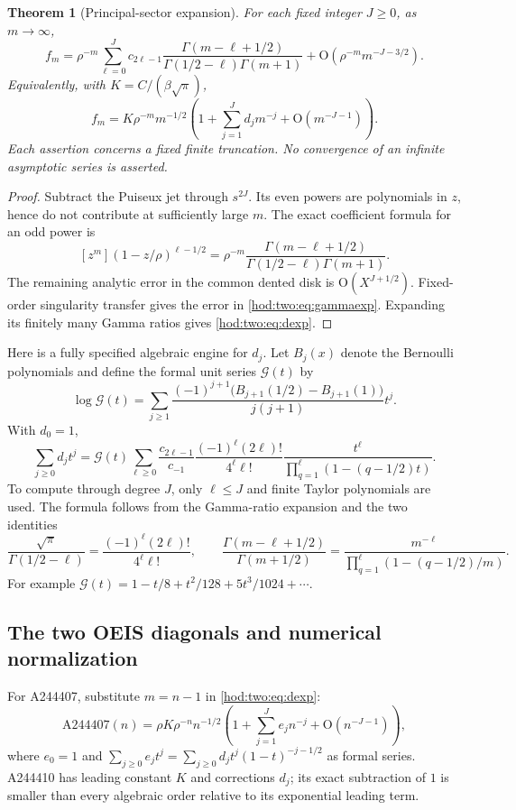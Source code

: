 \documentclass[11pt,letterpaper]{article}
\newtheorem{theorem}{Theorem}[section]
\theoremstyle{definition}\newtheorem{definition}[theorem]{Definition}
\theoremstyle{remark}\newtheorem{remark}[theorem]{Remark}
\newcommand{\bigO}{\mathrm O}
\begin{document}
\begin{theorem}[Principal-sector expansion]\label{hod:two:thm:allorders}
For each fixed integer $J\ge0$, as $m\to\infty$,
\begin{equation}\label{hod:two:eq:gammaexp}
f_m=\rho^{-m}\sum_{\ell=0}^{J}c_{2\ell-1}
\frac{\Gamma(m-\ell+1/2)}{\Gamma(1/2-\ell)\Gamma(m+1)}
+\bigO(\rho^{-m}m^{-J-3/2}).
\end{equation}
Equivalently, with $K=C/(\beta\sqrt\pi)$,
\begin{equation}\label{hod:two:eq:dexp}
f_m=K\rho^{-m}m^{-1/2}
\left(1+\sum_{j=1}^Jd_jm^{-j}+\bigO(m^{-J-1})\right).
\end{equation}
Each assertion concerns a fixed finite truncation. No convergence of an infinite asymptotic series is asserted.
\end{theorem}
\begin{proof}
Subtract the Puiseux jet through $s^{2J}$. Its even powers are polynomials in $z$, hence do not contribute at sufficiently large $m$. The exact coefficient formula for an odd power is
\[
[z^m](1-z/\rho)^{\ell-1/2}
=\rho^{-m}\frac{\Gamma(m-\ell+1/2)}{\Gamma(1/2-\ell)\Gamma(m+1)}.
\]
The remaining analytic error in the common dented disk is $\bigO(X^{J+1/2})$. Fixed-order singularity transfer gives the error in \eqref{hod:two:eq:gammaexp}. Expanding its finitely many Gamma ratios gives \eqref{hod:two:eq:dexp}.
\end{proof}

Here is a fully specified algebraic engine for $d_j$. Let $B_j(x)$ denote the Bernoulli polynomials and define the formal unit series $\mathcal G(t)$ by
\[
\log\mathcal G(t)=\sum_{j\ge1}
\frac{(-1)^{j+1}\bigl(B_{j+1}(1/2)-B_{j+1}(1)\bigr)}{j(j+1)}t^j.
\]
With $d_0=1$,
\begin{equation}\label{hod:two:eq:engine}
\sum_{j\ge0}d_jt^j
=\mathcal G(t)\sum_{\ell\ge0}\frac{c_{2\ell-1}}{c_{-1}}
\frac{(-1)^\ell(2\ell)!}{4^\ell\ell!}
\frac{t^\ell}{\prod_{q=1}^{\ell}(1-(q-1/2)t)}.
\end{equation}
To compute through degree $J$, only $\ell\le J$ and finite Taylor polynomials are used. The formula follows from the Gamma-ratio expansion and the two identities
\[
\frac{\sqrt\pi}{\Gamma(1/2-\ell)}=\frac{(-1)^\ell(2\ell)!}{4^\ell\ell!},\qquad
\frac{\Gamma(m-\ell+1/2)}{\Gamma(m+1/2)}
=\frac{m^{-\ell}}{\prod_{q=1}^{\ell}(1-(q-1/2)/m)}.
\]
For example $\mathcal G(t)=1-t/8+t^2/128+5t^3/1024+\cdots$.

\subsection{The two OEIS diagonals and numerical normalization}
For A244407, substitute $m=n-1$ in \eqref{hod:two:eq:dexp}:
\begin{equation}\label{hod:two:eq:eshift}
\mathrm{A244407}(n)=\rho K\rho^{-n}n^{-1/2}
\left(1+\sum_{j=1}^Je_jn^{-j}+\bigO(n^{-J-1})\right),
\end{equation}
where $e_0=1$ and
$\sum_{j\ge0}e_jt^j=\sum_{j\ge0}d_jt^j(1-t)^{-j-1/2}$ as formal series. A244410 has leading constant $K$ and corrections $d_j$; its exact subtraction of $1$ is smaller than every algebraic order relative to its exponential leading term.
\end{document}

